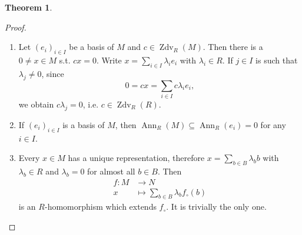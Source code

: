 \documentclass[12pt,a4paper]{report}
\theoremstyle{definition}
\newtheorem{theorem}{Theorem}[chapter] %
\theoremstyle{num.custom-title}
\DeclareMathOperator{\Zdv}{Zdv}
\DeclareMathOperator{\Ann}{Ann}
\DeclareMathOperator{\sse}{\subseteq}
\begin{document}
\begin{theorem}
\begin{proof}
\begin{enumerate}
\begin{center}
\end{center}
\item Let $(e_i)_{i \in I}$ be a basis of $M$ and $c \in \Zdv_R(M)$. Then there is a $0 \neq x \in M$ s.t. $cx=0$. Write $x = \sum_{i \in I} \lambda_i e_i$ with $\lambda_i \in R$. If $j \in I$ is such that $\lambda_j \neq 0$, since
\[
0 = cx = \sum_{i \in I} c\lambda_i e_i,
\]
we obtain $c \lambda_j = 0$, i.e. $c \in \Zdv_R(R)$.
\item If $(e_i)_{i \in I}$ is a basis of $M$, then $\Ann_R(M) \sse \Ann_R(e_i)=0$ for any $i \in I$.
\item Every $x \in M$ has a unique representation, therefore $x = \sum_{b \in B} \lambda_b b$ with $\lambda_b \in R$ and $\lambda_b = 0$ for almost all $b \in B$. Then
\begin{align*}
f \colon M &\to N \\
x &\mapsto \sum_{b \in B} \lambda_b f_\circ(b)
\end{align*}
is an $R$-homomorphism which extends $f_\circ$. It is trivially the only one.
\end{enumerate}
\end{proof}
\end{theorem}
\end{document}
